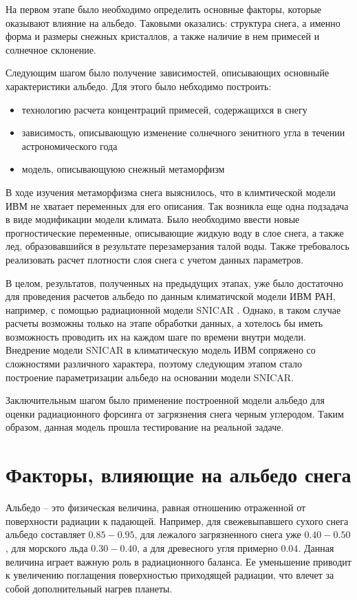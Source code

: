 \documentclass[a4paper, fontsize=14pt]{scrartcl}
\begin{document}
На первом этапе было необходимо определить основные факторы, которые оказывают влияние на альбедо. Таковыми оказались: структура снега, а именно форма и размеры снежных кристаллов, а также наличие в нем примесей и солнечное склонение.

Следующим шагом было получение зависимостей, описывающих основныйе характеристики альбедо. Для этого было небходимо построить:
\begin{itemize}
    \item технологию расчета концентраций примесей, содержащихся в снегу
    \item зависимость, описывающую изменение солнечного зенитного угла в течении астрономического года
    \item модель, описывающуюю снежный метаморфизм 
\end{itemize} 

В ходе изучения метаморфизма снега выяснилось, что в климтической модели ИВМ не хватает переменных для его описания. Так возникла еще одна подзадача в виде модификации модели климата. Было необходимо ввести новые прогностические переменные, описывающие жидкую воду в слое снега, а также лед, образовавшийся в результате перезамерзания талой воды. Также требовалось реализовать расчет плотности слоя снега с учетом данных параметров.

В целом, результатов, полученных на предыдущих этапах, уже было достаточно для проведения расчетов альбедо по данным климатичской модели ИВМ РАН, например, с помощью радиационной модели SNICAR \cite{Flanner2007}. Однако, в таком случае расчеты возможны только на этапе обработки данных, а хотелось бы иметь возможность проводить их на каждом шаге по времени внутри модели. Внедрение модели SNICAR в климатическую модель ИВМ сопряжено со сложностями различного характера, поэтому следующим этапом стало построение параметризации альбедо на основании модели SNICAR. 

Заключительным шагом было применение построенной модели альбедо для оценки радиационного форсинга от загрязнения снега черным углеродом. Таким образом, данная модель прошла тестирование на реальной задаче. 


\newpage
\section{Факторы, влияющие на альбедо снега}
Альбедо -- это физическая величина, равная отношению отраженной от поверхности радиации к падающей. Например, для свежевыпавшего сухого снега альбедо составляет $0.85-0.95$, для лежалого загрязненного снега уже $0.40-0.50$, для морского льда $0.30-0.40$, а для древесного угля примерно $0.04$. Данная величина играет важную роль в радиационного баланса. Ее уменьшение приводит к увеличению поглащения поверхностью приходящей радиации, что влечет за собой дополнительный нагрев планеты. 
\end{document}
